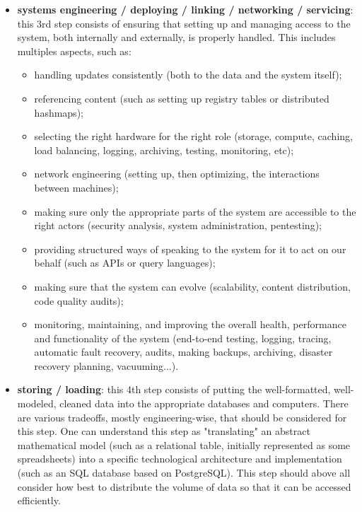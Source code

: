 \documentclass{article}
\begin{document}
\begin{itemize}
\begin{itemize}
		\item \textbf{systems engineering / deploying / linking / networking / servicing}: this 3rd step consists of ensuring that setting up and managing access to the system, both internally and externally, is properly handled. This includes multiples aspects, such as:
		\begin{itemize}
			\item handling updates consistently (both to the data and the system itself);
			\item referencing content (such as setting up registry tables or distributed hashmaps);
			\item selecting the right hardware for the right role (storage, compute, caching, load balancing, logging, archiving, testing, monitoring, etc);
			\item network engineering (setting up, then optimizing, the interactions between machines);
			\item making sure only the appropriate parts of the system are accessible to the right actors (security analysis, system administration, pentesting);
			\item providing structured ways of speaking to the system for it to act on our behalf (such as APIs or query languages);
			\item making sure that the system can evolve (scalability, content distribution, code quality audits);
			\item monitoring, maintaining, and improving the overall health, performance and functionality of the system (end-to-end testing, logging, tracing, automatic fault recovery, audits, making backups, archiving, disaster recovery planning, vacuuming...).
		\end{itemize}

		\item \textbf{storing / loading}: this 4th step consists of putting the well-formatted, well-modeled, cleaned data into the appropriate databases and computers. There are various tradeoffs, mostly engineering-wise, that should be considered for this step. One can understand this step as "translating" an abstract mathematical model (such as a relational table, initially represented as some spreadsheets) into a specific technological architecture and implementation (such as an SQL database based on PostgreSQL). This step should above all consider how best to distribute the volume of data so that it can be accessed efficiently.


\end{itemize}
\end{itemize}
\end{document}
